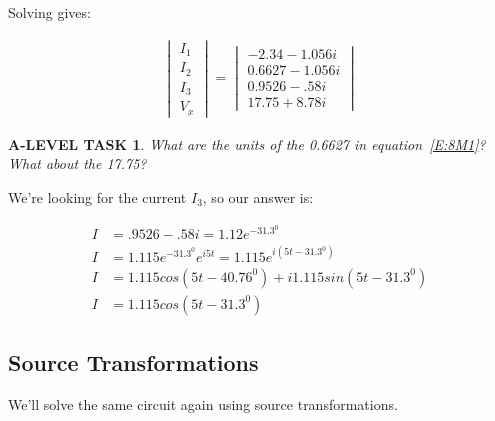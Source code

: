 \documentclass{book}
\numberwithin{equation}{section}
\newtheorem{alevel}{A-LEVEL TASK}
\theoremstyle{definition}
\begin{document}
Solving gives:

\begin{align}
\begin{vmatrix}I_1\\I_2\\I_3\\V_x \end{vmatrix} =
\begin{vmatrix} -2.34-1.056i\\0.6627-1.056i \\0.9526-.58i \\17.75+8.78i \end{vmatrix} \label{E:8M1}
\end{align}

\begin{alevel}
What are the units of the 0.6627 in equation~\ref{E:8M1}? What about the 17.75?
\end{alevel}

We're looking for the current $I_3$, so our answer is:

\begin{align*}
I&=.9526-.58i=1.12e^{-31.3^0}\\
I &= 1.115e^{-31.3^0}e^{i5t}=1.115e^{i(5t-31.3^0)}\\
I&=1.115cos(5t-40.76^0)+i1.115sin(5t-31.3^0)\\
I&=1.115cos(5t-31.3^0)
\end{align*}

\subsection{Source Transformations}
We'll solve the same circuit again using source transformations.
\end{document}
